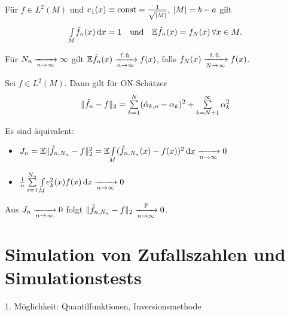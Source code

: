 \documentclass{cheat-sheet}
\renewcommand{\P}{\mathbb{P}} %
\newcommand{\E}{\mathbb{E}} %
\begin{document}
\begin{lem}
  Für $f \in L^2 (M)$ und $e_1 (x) \equiv \mathrm{const} = \tfrac{1}{\sqrt{\lvert M\rvert}}$, $\lvert M\rvert = b - a$ gilt
  \[
    \Int{M}{}{\hat{f}_n(x)}{x} = 1
    \quad \text{und} \quad
    \E \hat{f}_n(x) = f_N(x) \, \forall x \in M.
  \]
\end{lem}


\begin{kor}
  Für $N_n \xrightarrow[n \to \infty]{} \infty$ gilt $\E \hat{f}_n(x) \xra[n \to \infty]{\text{f.\,ü.}} f(x)$, falls $f_N(x) \xrightarrow[N \to \infty]{\text{f.\,ü.}} f(x)$.
\end{kor}

\begin{lem}
  Sei $f \in L^2(M)$.
  Dann gilt für ON-Schätzer
  \[
    \norm{\hat{f}_n - f}_2 = \sum_{k=1}^N (\hat{\alpha}_{k,n} - \alpha_k)^2 + \sum_{k = N+1}^\infty \alpha_k^2
  \]
\end{lem}


\begin{satz}
  Es sind äquivalent:
  \begin{itemize}
    \item $J_n = \E \norm{\hat{f}_{n,N_n} - f}_2^2 = \E \AInt{M}{(\hat{f}_{n,N_n}(x) - f(x))^2}{x} \xra[n \to \infty]{} 0$
    \item $\tfrac{1}{n} \sum_{i=1}^{N_n} \AInt{M}{e_k^2(x) f(x)}{x} \xra[n \to \infty]{} 0$
  \end{itemize}
\end{satz}

\begin{kor}
  Aus $J_n \xrightarrow[n \to \infty]{} 0$ folgt $\norm{\hat{f}_{n,N_n} - f}_2 \xra[n \to \infty]{\P} 0$.
\end{kor}


\section{Simulation von Zufallszahlen und Simulationstests}


1. Möglichkeit: Quantilfunktionen, Inversionsmethode
\end{document}
